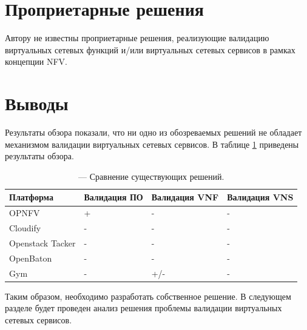\documentclass[oneside,final,14pt,a4paper]{extreport}
\begin{document}
\section{Проприетарные решения}
Автору не известны проприетарные решения, реализующие валидацию виртуальных сетевых функций и/или виртуальных сетевых сервисов в рамках концепции NFV.


\section{Выводы}
Результаты обзора показали, что ни одно из обозреваемых решений не обладает механизмом валидации виртуальных сетевых сервисов. В таблице \ref{tab:nfv_platform_comprassion} приведены результаты обзора.

\renewcommand{\arraystretch}{1.5}
\begin{table}[h]
\center %
\begin{tabular}{|p{}|p{}|p{}|p{}|} %
\hline %
Плат\-фор\-ма & Валидация ПО & Валидация VNF & Валидация VNS \\
\hline
OPNFV & + & - & - \\
\hline
Cloudify & - & - & - \\
\hline
Openstack Tacker & - & - & - \\
\hline
OpenBaton & - & - & - \\
\hline
Gym & - & +/- & - \\
\hline
\end{tabular}
\caption{--- Сравнение существующих решений.}
\label{tab:nfv_platform_comprassion}
\end{table}


Таким образом, необходимо разработать собственное решение. В следующем разделе будет проведен анализ решения проблемы валидации виртуальных сетевых сервисов.
\end{document}
